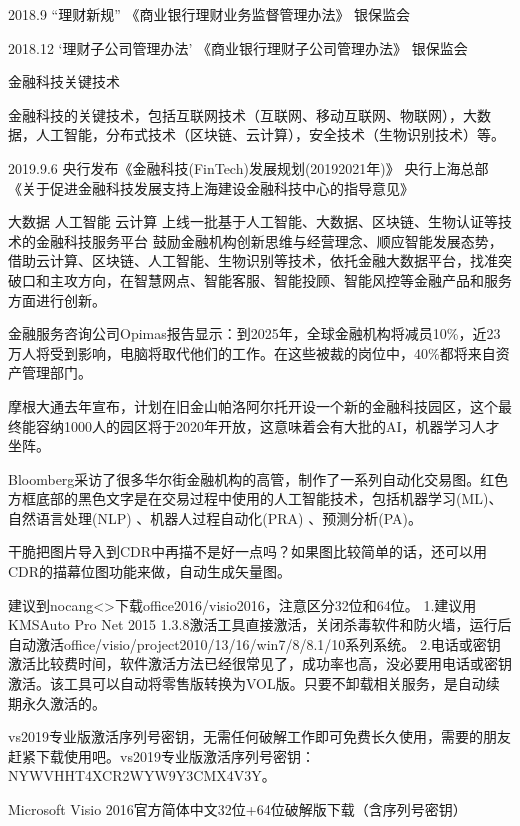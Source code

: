 \documentclass[letterpaper,12pt,english]{sphinxmanual}
\begin{document}
2018.9 “理财新规”
《商业银行理财业务监督管理办法》
银保监会

2018.12 ‘理财子公司管理办法’
《商业银行理财子公司管理办法》
银保监会

金融科技关键技术

金融科技的关键技术，包括互联网技术（互联网、移动互联网、物联网），大数据，人工智能，分布式技术（区块链、云计算），安全技术（生物识别技术）等。

2019.9.6 央行发布《金融科技(FinTech)发展规划(2019\sphinxhyphen{}2021年)》
央行上海总部《关于促进金融科技发展支持上海建设金融科技中心的指导意见》

大数据
人工智能
云计算
上线一批基于人工智能、大数据、区块链、生物认证等技术的金融科技服务平台
鼓励金融机构创新思维与经营理念、顺应智能发展态势，借助云计算、区块链、人工智能、生物识别等技术，依托金融大数据平台，找准突破口和主攻方向，在智慧网点、智能客服、智能投顾、智能风控等金融产品和服务方面进行创新。

金融服务咨询公司Opimas报告显示：到2025年，全球金融机构将减员10\%，近23万人将受到影响，电脑将取代他们的工作。在这些被裁的岗位中，40\%都将来自资产管理部门。

摩根大通去年宣布，计划在旧金山帕洛阿尔托开设一个新的金融科技园区，这个最终能容纳1000人的园区将于2020年开放，这意味着会有大批的AI，机器学习人才坐阵。

Bloomberg采访了很多华尔街金融机构的高管，制作了一系列自动化交易图。红色方框底部的黑色文字是在交易过程中使用的人工智能技术，包括机器学习(ML)、自然语言处理(NLP) 、机器人过程自动化(PRA) 、预测分析(PA)。

干脆把图片导入到CDR中再描不是好一点吗？如果图比较简单的话，还可以用CDR的描幕位图功能来做，自动生成矢量图。

建议到nocang<>下载office2016/visio2016，注意区分32位和64位。
1.建议用KMSAuto Pro Net 2015 1.3.8激活工具直接激活，关闭杀毒软件和防火墙，运行后自动激活office/visio/project2010/13/16/win7/8/8.1/10系列系统。
2.电话或密钥激活比较费时间，软件激活方法已经很常见了，成功率也高，没必要用电话或密钥激活。该工具可以自动将零售版转换为VOL版。只要不卸载相关服务，是自动续期永久激活的。

vs2019专业版激活序列号密钥，无需任何破解工作即可免费长久使用，需要的朋友赶紧下载使用吧。vs2019专业版激活序列号密钥：NYWVH\sphinxhyphen{}HT4XC\sphinxhyphen{}R2WYW\sphinxhyphen{}9Y3CM\sphinxhyphen{}X4V3Y。

Microsoft Visio 2016官方简体中文32位+64位破解版下载（含序列号密钥）
\end{document}
